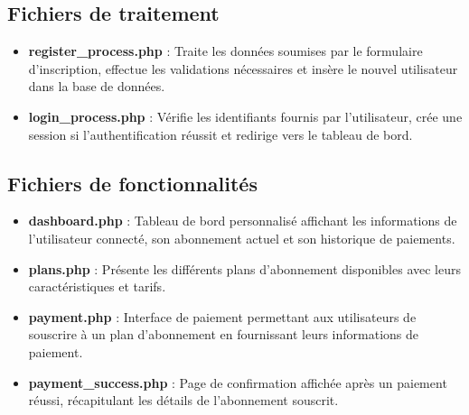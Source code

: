 \documentclass[12pt,a4paper]{report}
\begin{document}
\subsection{Fichiers de traitement}
\begin{itemize}
    \item \textbf{register\_process.php} : Traite les données soumises par le formulaire d'inscription, effectue les validations nécessaires et insère le nouvel utilisateur dans la base de données.
    
    \item \textbf{login\_process.php} : Vérifie les identifiants fournis par l'utilisateur, crée une session si l'authentification réussit et redirige vers le tableau de bord.
\end{itemize}

\subsection{Fichiers de fonctionnalités}
\begin{itemize}
    \item \textbf{dashboard.php} : Tableau de bord personnalisé affichant les informations de l'utilisateur connecté, son abonnement actuel et son historique de paiements.
    
    \item \textbf{plans.php} : Présente les différents plans d'abonnement disponibles avec leurs caractéristiques et tarifs.
    
    \item \textbf{payment.php} : Interface de paiement permettant aux utilisateurs de souscrire à un plan d'abonnement en fournissant leurs informations de paiement.
    
    \item \textbf{payment\_success.php} : Page de confirmation affichée après un paiement réussi, récapitulant les détails de l'abonnement souscrit.
\end{itemize}
\end{document}
